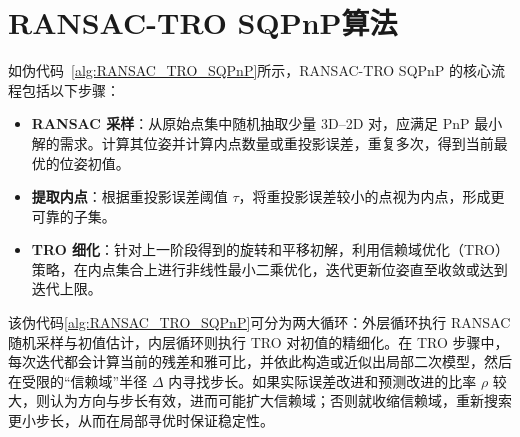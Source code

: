 \section{RANSAC-TRO SQPnP算法}
\label{sec:RANSAC-TRO-SQPnP:Algorithm}

如伪代码~\ref{alg:RANSAC_TRO_SQPnP}所示，RANSAC-TRO SQPnP 的核心流程包括以下步骤：
\begin{itemize}
	\item \textbf{RANSAC 采样}：从原始点集中随机抽取少量 3D--2D 对，应满足 PnP 最小解的需求。计算其位姿并计算内点数量或重投影误差，重复多次，得到当前最优的位姿初值。
	\item \textbf{提取内点}：根据重投影误差阈值 $\tau$，将重投影误差较小的点视为内点，形成更可靠的子集。
	\item \textbf{TRO 细化}：针对上一阶段得到的旋转和平移初解，利用信赖域优化（TRO）策略，在内点集合上进行非线性最小二乘优化，迭代更新位姿直至收敛或达到迭代上限。
\end{itemize}

该伪代码\autoref{alg:RANSAC_TRO_SQPnP}可分为两大循环：外层循环执行 RANSAC 随机采样与初值估计，内层循环则执行 TRO 对初值的精细化。在 TRO 步骤中，每次迭代都会计算当前的残差和雅可比，并依此构造或近似出局部二次模型，然后在受限的“信赖域”半径 $\Delta$ 内寻找步长。如果实际误差改进和预测改进的比率 $\rho$ 较大，则认为方向与步长有效，进而可能扩大信赖域；否则就收缩信赖域，重新搜索更小步长，从而在局部寻优时保证稳定性。

